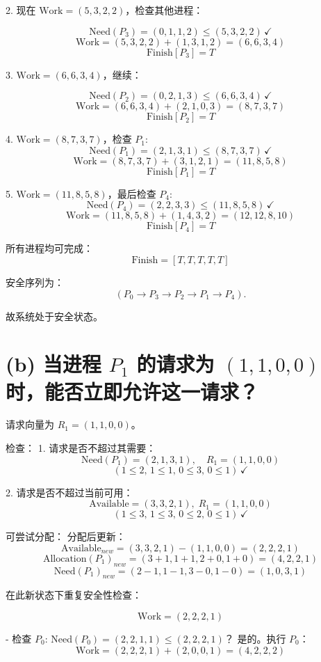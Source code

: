 \documentclass[UTF8]{homework}
\begin{document}
\begin{homeworkProblem}
2. 现在 $\text{Work}=(5,3,2,2)$，检查其他进程：
   
   \[
   \text{Need}(P_3)=(0,1,1,2) \leq (5,3,2,2)\, \checkmark
   \]
   \[
   \text{Work}=(5,3,2,2) + (1,3,1,2) = (6,6,3,4)
   \]
   \[
   \text{Finish}[P_3] = T
   \]

3. $\text{Work}=(6,6,3,4)$，继续：
   
   \[
   \text{Need}(P_2)=(0,2,1,3) \leq (6,6,3,4)\, \checkmark
   \]
   \[
   \text{Work}=(6,6,3,4) + (2,1,0,3) = (8,7,3,7)
   \]
   \[
   \text{Finish}[P_2] = T
   \]

4. $\text{Work}=(8,7,3,7)$，检查 $P_1$:
   \[
   \text{Need}(P_1)=(2,1,3,1) \leq (8,7,3,7)\, \checkmark
   \]
   \[
   \text{Work}=(8,7,3,7) + (3,1,2,1) = (11,8,5,8)
   \]
   \[
   \text{Finish}[P_1]=T
   \]

5. $\text{Work}=(11,8,5,8)$，最后检查 $P_4$:
   \[
   \text{Need}(P_4)=(2,2,3,3) \leq (11,8,5,8)\, \checkmark
   \]
   \[
   \text{Work}=(11,8,5,8) + (1,4,3,2)=(12,12,8,10)
   \]
   \[
   \text{Finish}[P_4]=T
   \]

所有进程均可完成：
\[
\text{Finish}=[T,T,T,T,T]
\]

安全序列为：
\[
(P_0 \rightarrow P_3 \rightarrow P_2 \rightarrow P_1 \rightarrow P_4).
\]

故系统处于安全状态。

\section*{(b) 当进程 $P_1$ 的请求为 $(1,1,0,0)$ 时，能否立即允许这一请求？}

请求向量为 $R_1=(1,1,0,0)$。

检查：
1. 请求是否不超过其需要：
   \[
   \text{Need}(P_1)=(2,1,3,1), \quad R_1=(1,1,0,0)
   \]
   \[
   (1 \leq 2,\,1 \leq 1,\,0 \leq 3,\,0 \leq 1)\, \checkmark
   \]

2. 请求是否不超过当前可用：
   \[
   \text{Available}=(3,3,2,1),\; R_1=(1,1,0,0)
   \]
   \[
   (1 \leq 3,\,1 \leq 3,\,0 \leq 2,\,0 \leq 1)\, \checkmark
   \]

可尝试分配：  
分配后更新：
\[
\text{Available}_{new} = (3,3,2,1)-(1,1,0,0)=(2,2,2,1)
\]
\[
\text{Allocation}(P_1)_{new}=(3+1,1+1,2+0,1+0)=(4,2,2,1)
\]
\[
\text{Need}(P_1)_{new}=(2-1,1-1,3-0,1-0)=(1,0,3,1)
\]

在此新状态下重复安全性检查：

\[
\text{Work}=(2,2,2,1)
\]

- 检查 $P_0$: Need$(P_0)=(2,2,1,1)\leq(2,2,2,1)$？ 是的。执行 $P_0$：
  \[
  \text{Work}=(2,2,2,1)+(2,0,0,1)=(4,2,2,2)
  \]


\end{homeworkProblem}
\end{document}
